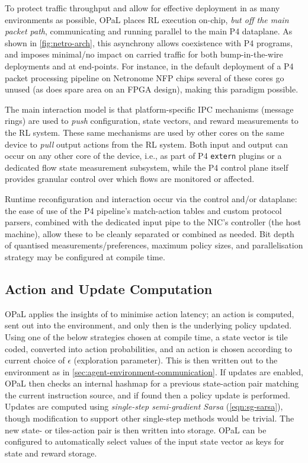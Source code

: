 \documentclass[sigconf,natbib=false]{acmart}
\newcommand{\approachshort}{OPaL}
\begin{document}

To protect traffic throughput and allow for effective deployment in as many environments as possible, \approachshort{} places RL execution on-chip, \emph{but off the main packet path}, communicating and running parallel to the main P4 dataplane.
As shown in \cref{fig:netro-arch}, this asynchrony allows coexistence with P4 programs, and imposes minimal/no impact on carried traffic for both bump-in-the-wire deployments and at end-points.
For instance, in the default deployment of a P4 packet processing pipeline on Netronome NFP chips several of these cores go unused (as does spare area on an FPGA design), making this paradigm possible.

The main interaction model is that platform-specific IPC mechanisms (message rings) are used to \emph{push} configuration, state vectors, and reward measurements to the RL system.
These same mechanisms are used by other cores on the same device to \emph{pull} output actions from the RL system.
Both input and output can occur on any other core of the device, i.e., as part of P4 \texttt{extern} plugins or a dedicated flow state measurement subsystem, while the P4 control plane itself provides granular control over which flows are monitored or affected.

Runtime reconfiguration and interaction occur via the control and/or dataplane: the ease of use of the P4 pipeline's match-action tables and custom protocol parsers, combined with the dedicated input pipe to the NIC's controller (the host machine), allow these to be cleanly separated or combined as needed.
Bit depth of quantised measurements/preferences, maximum policy sizes, and parallelisation strategy may be configured at compile time.

\subsection{Action and Update Computation}
\approachshort{} applies the insights of \textcite{DBLP:journals/firai/TravnikMSP18} to minimise action latency; an action is computed, sent out into the environment, and only then is the underlying policy updated.
Using one of the below strategies chosen at compile time, a state vector is tile coded, converted into action probabilities, and an action is chosen according to current choice of $\epsilon$ (exploration parameter).
This is then written out to the environment as in \cref{sec:agent-environment-communication}.
If updates are enabled, \approachshort{} then checks an internal hashmap for a previous state-action pair matching the current instruction source, and if found then a policy update is performed.
Updates are computed using \emph{single-step semi-gradient Sarsa} (\cref{eqn:sg-sarsa}), though modification to support other single-step methods would be trivial.
The new state- or tiles-action pair is then written into storage.
\approachshort{} can be configured to automatically select values of the input state vector as keys for state and reward storage.
\end{document}
